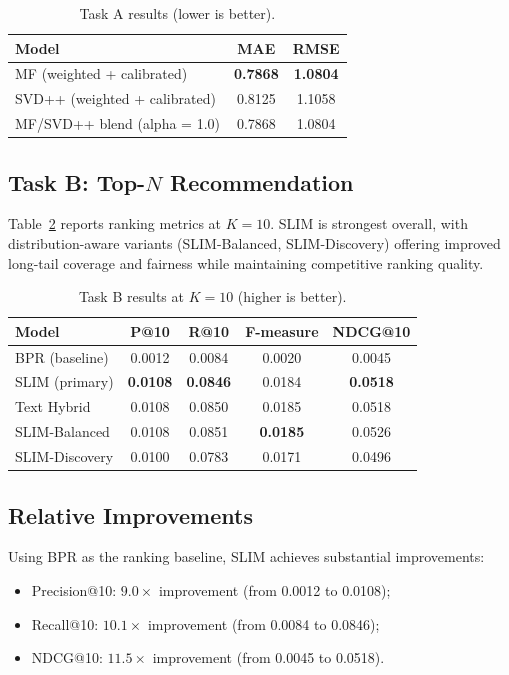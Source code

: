 \documentclass[sigconf,nonacm]{acmart}
\begin{document}
\begin{table}[t]
  \caption{Task A results (lower is better).}
  \label{tab:rating-results}
  \centering
  \begin{tabular}{lcc}
    \toprule
    Model & MAE & RMSE \\
    \midrule
    MF (weighted + calibrated) & \textbf{0.7868} & \textbf{1.0804} \\
    SVD++ (weighted + calibrated) & 0.8125 & 1.1058 \\
    MF/SVD++ blend (alpha = 1.0) & 0.7868 & 1.0804 \\
    \bottomrule
  \end{tabular}
\end{table}

\subsection{Task B: Top-$N$ Recommendation}
Table~\ref{tab:ranking-results} reports ranking metrics at $K=10$. SLIM is strongest overall, with distribution-aware variants (SLIM-Balanced, SLIM-Discovery) offering improved long-tail coverage and fairness while maintaining competitive ranking quality.

\begin{table}[t]
  \caption{Task B results at $K=10$ (higher is better).}
  \label{tab:ranking-results}
  \centering
  \begin{tabular}{lcccc}
    \toprule
    Model & P@10 & R@10 & F-measure & NDCG@10 \\
    \midrule
    BPR (baseline) & 0.0012 & 0.0084 & 0.0020 & 0.0045 \\
    SLIM (primary) & \textbf{0.0108} & \textbf{0.0846} & 0.0184 & \textbf{0.0518} \\
    Text Hybrid & 0.0108 & 0.0850 & 0.0185 & 0.0518 \\
    SLIM-Balanced & 0.0108 & 0.0851 & \textbf{0.0185} & 0.0526 \\
    SLIM-Discovery & 0.0100 & 0.0783 & 0.0171 & 0.0496 \\
    \bottomrule
  \end{tabular}
\end{table}

\subsection{Relative Improvements}
Using BPR as the ranking baseline, SLIM achieves substantial improvements:
\begin{itemize}
  \item Precision@10: $9.0\times$ improvement (from 0.0012 to 0.0108);
  \item Recall@10: $10.1\times$ improvement (from 0.0084 to 0.0846);
  \item NDCG@10: $11.5\times$ improvement (from 0.0045 to 0.0518).
\end{itemize}
\end{document}
